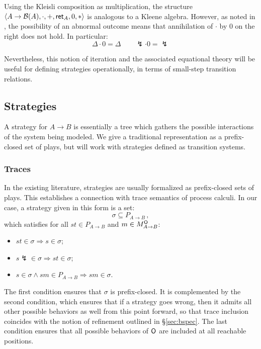 Using the Kleisli composition as multiplication,
the structure
$\langle A \rightarrow \mathcal{B}(A), {\cdot}, {+},  \mathsf{ret} _A, 0, * \rangle$
is analogous to a Kleene algebra.
However, as noted in \cite{failkat},
the possibility of an abnormal outcome
means that annihilation of $\cdot$ by $0$ on the right
does not hold.
In particular:
\[ \Delta \cdot 0 = \Delta \qquad \lightning \cdot 0 = \lightning \]

Nevertheless,
this notion of iteration
and the associated equational theory
will be useful
for defining strategies operationally,
in terms of small-step transition relations.


\subsection{Strategies} %

A strategy for $A \rightarrow B$
is essentially a tree
which gathers the possible interactions of
the system being modeled.
We give a traditional representation
as a prefix-closed set of plays,
but will work with strategies defined as transition systems.

\subsubsection{Traces} %

In the existing literature,
strategies are usually formalized as prefix-closed sets of plays.
This establishes a connection with trace semantics of process calculi.
In our case,
a strategy given in this form is a set:
\[ \sigma \subseteq P_{A \rightarrow B} \,, \]
which satisfies
for all $st \in P_{A \rightarrow B}$
and $m \in M_{A \rightarrow B}^{ \mathsf{O} }$:
\begin{itemize}
  \item $st \in \sigma \Rightarrow s \in \sigma$;
  \item $s\lightning \in \sigma \Rightarrow st \in \sigma$;
  \item $s \in \sigma \wedge sm \in P_{A \rightarrow B}
    \Rightarrow sm \in \sigma$.
\end{itemize}
The first condition ensures that $\sigma$ is prefix-closed.
It is complemented by the second condition,
which ensures that if a strategy goes wrong,
then it admits all other possible behaviors as well
from this point forward,
so that trace inclusion coincides with the notion of refinement
outlined in \S\ref{sec:bspec}.
The last condition ensures that
all possible behaviors of $ \mathsf{O} $ are included
at all reachable positions.

